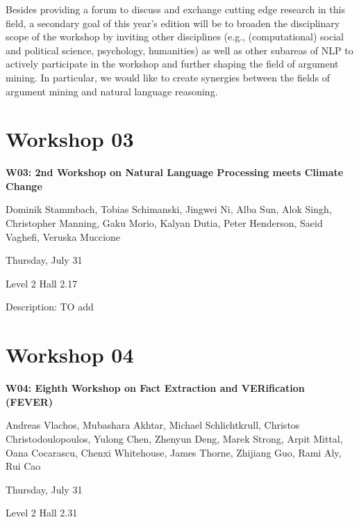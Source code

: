 Besides providing a forum to discuss and exchange cutting edge research in this field, a secondary goal of this year's edition will be to broaden the disciplinary scope of the workshop by inviting other disciplines (e.g., (computational) social and political science, psychology, humanities) as well as other subareas of NLP to actively participate in the workshop and further shaping the field of argument mining. In particular, we would like to create synergies between the fields of argument mining and natural language reasoning.	


\clearpage



\section[W03: 2nd Workshop on Natural Language Processing meets Climate Change]{Workshop 03}

\begin{center}
    {\Large \textbf{W03: 2nd Workshop on Natural Language Processing meets Climate Change}}

    Dominik Stammbach, Tobias Schimanski, Jingwei Ni, Alba Sun, Alok Singh, Christopher Manning, Gaku Morio, Kalyan Dutia, Peter Henderson, Saeid Vaghefi, Veruska Muccione

    Thursday, July 31
    
    Level 2 Hall 2.17

\end{center}

Description: TO add


\clearpage


\section[W04: Eighth Workshop on Fact Extraction and VERification (FEVER)]{Workshop 04}

\begin{center}
    {\Large \textbf{W04: Eighth Workshop on Fact Extraction and VERification (FEVER)}}

    Andreas Vlachos, Mubashara Akhtar, Michael Schlichtkrull, Christos Christodoulopoulos, Yulong Chen, Zhenyun Deng, Marek Strong, Arpit Mittal, Oana Cocarascu, Chenxi Whitehouse, James Thorne, Zhijiang Guo, Rami Aly, Rui Cao

     Thursday, July 31
    
    Level 2 Hall 2.31

\end{center}

